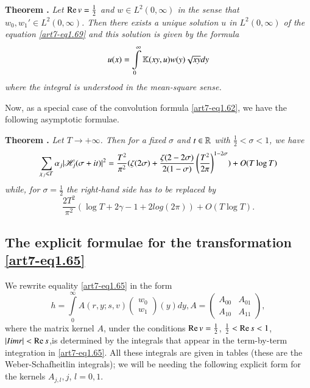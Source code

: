 \medskip
\noindent
{\bfseries Theorem .\label{art7-thm10}}
\textit{Let $\operatorname{Re} v =\frac{1}{2}$ and $w \in L^2 (0,\infty)$ in the sense that $w_0, w_1'\in L^2 (0,\infty)$. Then there exists a unique solution $u$ in $L^2 (0,\infty)$ of the equation \eqref{art7-eq1.69} and this solution is given by the formula}
\begin{equation}
u(x) = \int\limits^\infty_0 \mathbb{K} (xy, u) w(y) \sqrt{xy} dy \label{art7-1.70}
\end{equation}
\textit{where the integral is understood in the mean-square sense.}

Now, as a special case of the convolution formula \eqref{art7-eq1.62}, we have the following asymptotic formulae.

\medskip
\noindent
{\bfseries Theorem .\label{art7-thm11}}
\textit{Let $T \to + \infty$. Then for a fixed $\sigma$ and $t \in \mathbb{R}$ with $\frac{1}{2} < \sigma < 1$, we have}
\begin{equation}
\sum\limits_{\chi_j \leqslant T} \alpha_j |\mathscr{H}_j (\sigma +it)|^2 =\frac{T^2}{\pi^2} (\zeta (2\sigma) + \frac{\zeta(2-2\sigma)}{2(1-\sigma)} \left(\frac{T^2}{2\pi} \right)^{1-2\sigma} ) + O(T\log T)  \label{art7-eq1.71}
\end{equation}
\textit{while, for $\sigma =\frac{1}{2}$ the right-hand side has to be replaced by}
\begin{equation}
\frac{2T^2}{\pi^2} (\log T +2 \gamma - 1 +  2 log (2\pi)) + O(T \log T). \label{art7-eq1.72}
\end{equation}

\subsection{The explicit formulae for the transformation \eqref{art7-eq1.65}}\label{art7-subsec1.12}

We rewrite equality \eqref{art7-eq1.65} in the form
\begin{equation}
h = \int\limits^\infty_0 A(r, y; s, v)
\begin{pmatrix}
w_0 \\
w_1
\end{pmatrix} 
(y) dy, A = 
\begin{pmatrix}
A_{00} & A_{01}\\
A_{10} & A_{11}
\end{pmatrix},  \label{art7-eq1.73}
\end{equation}
where the matrix kernel $A$, under the conditions $\operatorname{Re} v = \frac{1}{2}$, $\frac{1}{2} < \operatorname{Re} s < 1$, $|Iim r| < \operatorname{Re} s$,\pageoriginale is determined by the integrals that appear in the term-by-term integration in \eqref{art7-eq1.65}. All these integrals are given in tables (these are the Weber-Schafheitlin integrals); we will be needing the following explicit form for the kernels $A_{j,l}, j$, $l=0,1$.

